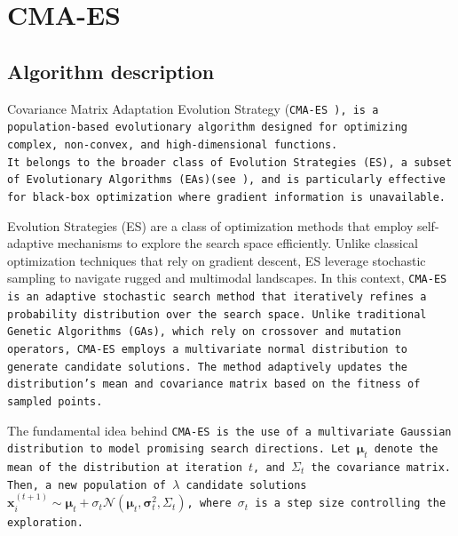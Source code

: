 \section{CMA-ES}

\subsection{Algorithm description}
Covariance Matrix Adaptation Evolution Strategy (\tt{CMA-ES} \cite{cmaessimplepractical}), is a population-based evolutionary algorithm designed for optimizing complex, non-convex, and high-dimensional functions.\\
It belongs to the broader class of Evolution Strategies (ES), a subset of Evolutionary Algorithms (EAs)(see \cite{sloss20192019evolutionaryalgorithmsreview}), and is particularly effective for black-box optimization where gradient information is unavailable.

Evolution Strategies (ES) are a class of optimization methods that employ self-adaptive mechanisms to explore the search space efficiently. 
Unlike classical optimization techniques that rely on gradient descent, ES leverage stochastic sampling to navigate rugged and multimodal landscapes.
In this context, \tt{CMA-ES} is an adaptive stochastic search method that iteratively refines a probability distribution over the search space. 
Unlike traditional Genetic Algorithms (GAs), which rely on crossover and mutation operators, \tt{CMA-ES} employs a multivariate normal distribution to generate candidate solutions. 
The method adaptively updates the distribution's mean and covariance matrix based on the fitness of sampled points.

The fundamental idea behind \tt{CMA-ES} is the use of a multivariate Gaussian distribution to model promising search directions. 
Let $\mathbf{\mu}_t$ denote the mean of the distribution at iteration $t$, and $\Sigma_t$ the covariance matrix. 
Then, a new population of $\lambda$ candidate solutions $\mathbf{x}_i^{(t+1)} \sim \mathbf{\mu}_t + \sigma_t\mathcal{N}(\mathbf{\mu}_t,\mathbf{\sigma}_t^2, \Sigma_t)$, where $\sigma_t$ is a step size controlling the exploration.  

